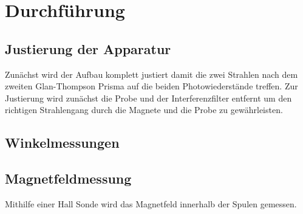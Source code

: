 \section{Durchführung}
\label{sec:Durchfuehrung}
\subsection{Justierung der Apparatur}
Zunächst wird der Aufbau komplett justiert damit die zwei Strahlen nach dem zweiten Glan-Thompson Prisma auf die beiden Photowiederstände treffen.
Zur Justierung wird zunächst die Probe und der Interferenzfilter entfernt um den richtigen Strahlengang durch die Magnete und die Probe zu gewährleisten.
\subsection{Winkelmessungen}
\subsection{Magnetfeldmessung}
Mithilfe einer Hall Sonde wird das Magnetfeld innerhalb der Spulen gemessen.